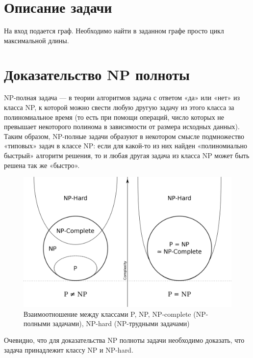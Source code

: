 \documentclass[spec, och, labwork]{shiza}
\begin{document}
\tableofcontents

\section{Описание задачи}

На вход подается граф. Необходимо найти в заданном графе просто цикл максимальной длины.

\section{Доказательство NP полноты}

NP-полная задача — в теории алгоритмов задача с ответом «да» или «нет» из класса NP, к 
которой можно свести любую другую задачу из этого класса за полиномиальное время (то есть при 
помощи операций, число которых не превышает некоторого полинома в зависимости от размера 
исходных данных). Таким образом, NP-полные задачи образуют в некотором смысле подмножество 
«типовых» задач в классе NP: если для какой-то из них найден «полиномиально быстрый» алгоритм 
решения, то и любая другая задача из класса NP может быть решена так же «быстро».

\begin{figure}[H]
    \centering      %
    \includegraphics[width=1.\textwidth]{4}
    \caption{Взаимоотношение между классами P, NP, NP-complete (NP-полными задачами), NP-hard (NP-трудными задачами)}
    \label{fig:image1}
\end{figure}

Очевидно, что для доказательства NP полноты задачи необходимо доказать, что задача принадлежит классу NP и NP-hard.
\end{document}

